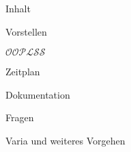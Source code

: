 
\begin{frame}
  \titlepage
\end{frame}

\begin{frame}[t]{Inhalt}
  \begin{bigitemize}[<+->]{3mm}
    \item<1-> Vorstellen

    \item<2-> $\mathcal{OOPLSS}$

    \item<3-> Zeitplan

    \item<4-> Dokumentation

    \item<5-> Fragen

    \item<6-> Varia und weiteres Vorgehen
  \end{bigitemize}
\end{frame}
